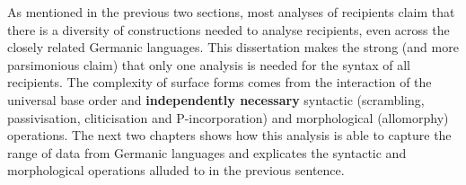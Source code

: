 As mentioned in the previous two sections, most analyses of recipients claim that there is a diversity of constructions needed to analyse recipients, even across the closely related Germanic languages. This dissertation makes the strong (and more parsimonious claim) that only one analysis is needed for the syntax of all recipients. The complexity of surface forms comes from the interaction of the universal base order and \textbf{independently necessary} syntactic (scrambling, passivisation, cliticisation and P-incorporation) and morphological (allomorphy) operations. The next two chapters shows how this analysis is able to capture the range of data from Germanic languages and explicates the syntactic and morphological operations alluded to in the previous sentence.

%
